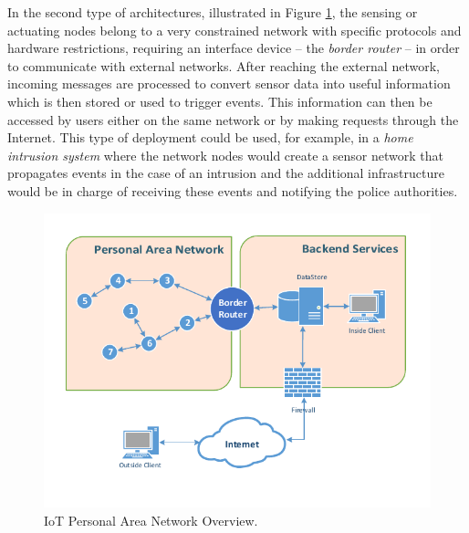  In the second type of architectures, illustrated in Figure \ref{fig:net_overview_small}, the sensing or actuating nodes belong to a very constrained network with specific protocols and hardware restrictions, requiring an interface device -- the \emph{border router} -- in order to communicate with external networks. After reaching the external network, incoming messages are processed to convert sensor data into useful information which is then stored or used to trigger events. This information can then be accessed by users either on the same network or by making requests through the Internet. This type of deployment could be used, for example, in a \emph{home intrusion system} where the network nodes would create a sensor network that propagates events in the case of an intrusion and the additional infrastructure would be in charge of receiving these events and notifying the police authorities.
\begin{figure}[h]
  \centering
  \includegraphics[width=0.8\linewidth]{figures/Network_Overview.pdf}
  \caption{IoT Personal Area Network Overview.}
  \label{fig:net_overview_small}
\end{figure}
